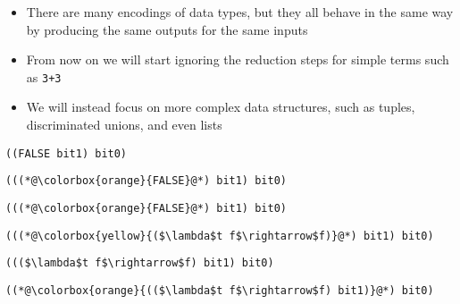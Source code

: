 \documentclass{beamer}
\begin{document}
\begin{frame}[fragile]{\CurrentSection}
\begin{block}{\CurrentSubSection}
\begin{itemize}
\item There are many encodings of data types, but they all behave in the same way by producing the same outputs for the same inputs
\item From now on we will start ignoring the reduction steps for simple terms such as \texttt{3+3}
\item We will instead focus on more complex data structures, such as tuples, discriminated unions, and even lists

\end{itemize}

\end{block}


\end{frame}

\begin{frame}[fragile]{\CurrentSection}
\lstset{basicstyle=\ttfamily\small}\lstset{numbers=none}\lstset{language=ML}\begin{lstlisting}
((FALSE bit1) bit0)
\end{lstlisting}
\pause\lstset{language=ML}\begin{lstlisting}
(((*@\colorbox{orange}{FALSE}@*) bit1) bit0)
\end{lstlisting}

\end{frame}

\begin{frame}[fragile]{\CurrentSection}
\lstset{basicstyle=\ttfamily\small}\lstset{numbers=none}\lstset{language=ML}\begin{lstlisting}
(((*@\colorbox{orange}{FALSE}@*) bit1) bit0)
\end{lstlisting}
\pause\lstset{language=ML}\begin{lstlisting}
(((*@\colorbox{yellow}{($\lambda$t f$\rightarrow$f)}@*) bit1) bit0)
\end{lstlisting}

\end{frame}

\begin{frame}[fragile]{\CurrentSection}
\lstset{basicstyle=\ttfamily\small}\lstset{numbers=none}\lstset{language=ML}\begin{lstlisting}
((($\lambda$t f$\rightarrow$f) bit1) bit0)
\end{lstlisting}
\pause\lstset{language=ML}\begin{lstlisting}
((*@\colorbox{orange}{(($\lambda$t f$\rightarrow$f) bit1)}@*) bit0)
\end{lstlisting}

\end{frame}
\end{document}
